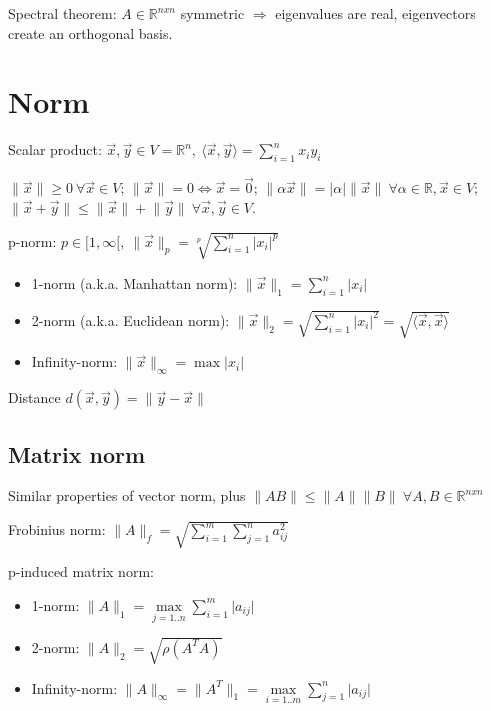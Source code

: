\documentclass[]{article}
\begin{document}
	Spectral theorem: $A \in \mathbb{R}^{nxn}$ symmetric $\Rightarrow$ eigenvalues are real, eigenvectors create an orthogonal basis.
	
	\section{Norm}
	
	Scalar product: $\vec{x},\vec{y} \in V=\mathbb{R}^n, \ \langle \vec{x},\vec{y} \rangle = \sum\limits_{i=1}^{n} x_i y_i$
	
	$\lVert \vec{x} \rVert \ge 0 \ \forall \vec{x} \in V$;
	$\lVert \vec{x} \rVert=0 \iff \vec{x}=\vec{0}$;	
	$\lVert \alpha \vec{x} \rVert = \lvert \alpha \rvert \lVert \vec{x} \rVert \ \forall \alpha \in \mathbb{R}, \vec{x} \in V$;	
	$\lVert \vec{x}+\vec{y} \rVert \le \lVert \vec{x} \rVert + \lVert \vec{y} \rVert \ \forall \vec{x},\vec{y} \in V$.
	
	p-norm: $p\in [1,\infty[, \ \lVert \vec{x} \rVert_p = \sqrt[p]{\sum_{i=1}^n \lvert x_i \rvert^p}$
	\begin{itemize}
		\item 1-norm (a.k.a. Manhattan norm): $\lVert \vec{x} \rVert_1 = \sum\limits_{i=1}^n \lvert x_i \rvert$
		\item 2-norm (a.k.a. Euclidean norm): $\lVert \vec{x} \rVert_2 = \sqrt{\sum\limits_{i=1}^n \lvert x_i \rvert^2} = \sqrt{\langle \vec{x},\vec{x} \rangle}$
		\item Infinity-norm: $\lVert \vec{x} \rVert_\infty = \max{\lvert x_i \rvert}$
	\end{itemize}

	Distance $d(\vec{x},\vec{y}) = \lVert \vec{y}-\vec{x} \rVert$

	\subsection{Matrix norm}
	
	Similar properties of vector norm, plus $\lVert A B \rVert \le \lVert A \rVert \lVert B \rVert \ \forall A,B\in \mathbb{R}^{nxn}$
	 
	Frobinius norm: $\lVert A \rVert_f = \sqrt{\sum_{i=1}^m \sum_{j=1}^n a_{ij}^2}$
	
	p-induced matrix norm: 
	\begin{itemize}
		\item 1-norm: $\lVert A \rVert_1 = \max\limits_{j=1..n}\sum\limits_{i=1}^m \lvert a_{ij} \rvert$
		\item 2-norm: $\lVert A \rVert_2 = \sqrt{\rho(A^T A)}$
		\item Infinity-norm: $\lVert A \rVert_\infty = \lVert A^T \rVert_1 = \max\limits_{i=1..m}\sum\limits_{j=1}^n \lvert a_{ij} \rvert$
	\end{itemize}
	
\end{document}
